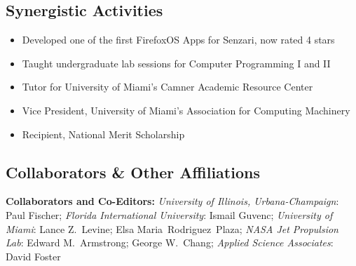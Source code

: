 \documentclass[svgnames,11pt]{article}
\begin{document}
\subsection{Synergistic Activities}

\begin{itemize}[itemsep=0pt]
    \item Developed one of the first FirefoxOS Apps for Senzari, now rated 4 stars
    \item Taught undergraduate lab sessions for Computer Programming I and II
    \item Tutor for University of Miami's Camner Academic Resource Center
    \item Vice President, University of Miami's Association for Computing Machinery
    \item Recipient, National Merit Scholarship
\end{itemize}

\subsection{Collaborators \& Other Affiliations}

\begin{bibsection}

    \item \textbf{Collaborators and Co-Editors:}
        \emph{University of Illinois, Urbana-Champaign}:
            Paul Fischer;
        \emph{Florida International University}:
            Ismail Guvenc;
        \emph{University of Miami}:
            Lance Z.~Levine;
            Elsa Maria~Rodriguez~Plaza;
        \emph{NASA Jet Propulsion Lab}:
            Edward M.~Armstrong;
            George W.~Chang;
        \emph{Applied Science Associates}:
            David Foster

\end{bibsection}
\end{document}
